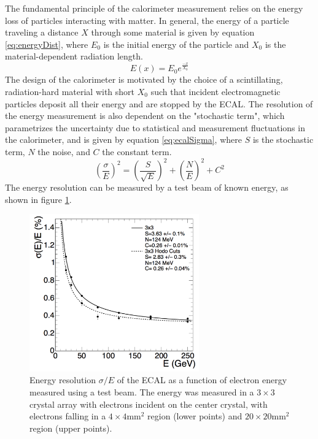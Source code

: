 The fundamental principle of the calorimeter measurement relies on the energy loss of particles interacting with matter. In general, the energy of a particle traveling a distance $X$ through some material is given by equation \ref{eq:energyDist}, where $E_0$ is the initial energy of the particle and $X_0$ is the material-dependent radiation length. 
\begin{equation}
	\label{eq:energyDist}
	E(x)=E_0 e^{\frac{-x}{X_0}}
\end{equation}
The design of the calorimeter is motivated by the choice of a scintillating, radiation-hard material with short $X_0$ such that incident electromagnetic particles deposit all their energy and are stopped by the ECAL. The resolution of the energy measurement is also dependent on the "stochastic term", which parametrizes the uncertainty due to statistical and measurement fluctuations in the calorimeter, and is given by equation \ref{eq:ecalSigma}, where $S$ is the stochastic term, $N$ the noise, and $C$ the constant term. 
\begin{equation}
	\label{eq:ecalSigma}
	\left(\frac{\sigma}{E}\right)^2=\left(\frac{S}{\sqrt{E}}\right)^2+\left(\frac{N}{E}\right)^2+C^2
\end{equation}
The energy resolution can be measured by a test beam of known energy, as shown in figure \ref{fig:ecalSigma}.
\begin{figure}
	\centering
	\includegraphics[width=0.65\textwidth]{detector/figs/ecalRes}
	\caption{Energy resolution $\sigma/E$ of the ECAL as a function of electron energy measured using a test beam. The energy was measured in a $3\times3$ crystal array with electrons incident on the center crystal, with electrons falling in a $4\times4\text{mm}^2$ region (lower points) and $20\times20\text{mm}^2$ region (upper points).}
	\label{fig:ecalSigma}
\end{figure}

